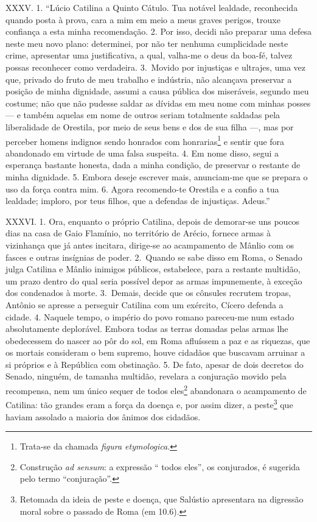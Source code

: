 XXXV. 1. “Lúcio Catilina a Quinto Cátulo. Tua notável lealdade, reconhecida
quando posta à prova, cara a mim em meio a meus graves perigos, trouxe
confiança a esta minha recomendação. 2. Por isso, decidi não preparar uma defesa
neste meu novo plano: determinei, por não ter nenhuma cumplicidade neste crime,
apresentar uma justificativa, a qual, valha-me o deus da boa-fé, talvez possas
reconhecer como verdadeira. 3.~Movido por injustiças e ultrajes, uma vez que,
privado do fruto de meu trabalho e indústria, não alcançava preservar a posição
de minha dignidade, assumi a causa pública dos miseráveis, segundo meu costume;
não que não pudesse saldar as dívidas em meu nome com minhas posses --- e
também aquelas em nome de outros seriam totalmente saldadas pela liberalidade
de Orestila, por meio de seus bens e dos de sua filha ---, mas por perceber
homens indignos sendo honrados com honrarias\footnote{Trata-se da chamada
\emph{figura etymologica}.} e sentir que fora abandonado em virtude de uma
falsa suspeita. 4. Em nome disso, segui a esperança bastante honesta, dada a
minha condição, de preservar o restante de minha dignidade. 5. Embora deseje
escrever mais, anunciam-me que se prepara o uso da força contra mim. 6. Agora
recomendo-te Orestila e a confio a tua lealdade; imploro, por teus filhos, que
a defendas de injustiças. Adeus.”

XXXVI. 1. Ora, enquanto o próprio Catilina, depois de demorar-se uns poucos
dias na casa de Gaio Flamínio, no território de Arécio, fornece armas à vizinhança
que já antes incitara, dirige-se ao acampamento de Mânlio com os fasces e
outras insígnias de poder. 2.~Quando se sabe disso em Roma, o Senado julga
Catilina e Mânlio inimigos públicos, estabelece, para a restante multidão, um
prazo dentro do qual seria possível depor as armas impunemente, à exceção dos
condenados à morte. 3.~Demais, decide que os cônsules recrutem tropas, Antônio
se apresse a perseguir Catilina com um exército, Cícero defenda a cidade. 4.
Naquele tempo, o império do povo romano pareceu-me num estado absolutamente
deplorável. Embora todas as terras domadas pelas armas lhe obedecessem do
nascer ao pôr do sol, em Roma afluíssem a paz e as riquezas, que os mortais
consideram o bem supremo, houve cidadãos que buscavam arruinar a si próprios e
à República com obstinação. 5. De fato, apesar de dois decretos do Senado,
ninguém, de tamanha multidão, revelara a conjuração movido pela recompensa,
nem um único sequer de todos eles\footnote{Construção \emph{ad sensum}: a
expressão `` todos eles'', os conjurados, é sugerida pelo termo
``conjuração''.} abandonara o acampamento de Catilina: tão  grandes eram a
força da doença e, por assim dizer, a peste\footnote{Retomada da ideia de peste
e doença, que Salústio apresentara na digressão moral sobre o passado de Roma
(em 10.6).} que haviam assolado a maioria dos ânimos dos cidadãos.

